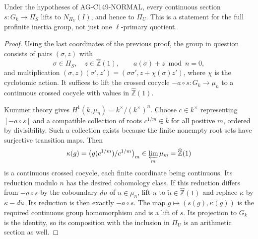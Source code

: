 \begin{proposition}
Under the hypotheses of AG-C149-NORMAL, every continuous section
$s:G_k\to\Pi_S$ lifts to $N_{\Pi_U}(I)$, and hence to $\Pi_U$.
This is a statement for the full profinite inertia group,
not just one $\ell$-primary quotient.
\end{proposition}
\begin{proof}
Using the last coordinates of the previous proof, the group in
question consists of pairs $(\sigma,z)$ with
\[
 \sigma\in\Pi_S,\quad z\in\widehat{\mathbb Z}(1),\qquad
 a(\sigma)+z\bmod n=0,
\]
and multiplication
$(\sigma,z)(\sigma',z')=(\sigma\sigma',z+\chi(\sigma)z')$,
where $\chi$ is the cyclotomic action. It suffices to lift the
crossed cocycle $-a\circ s:G_k\to\mu_n$ to a continuous
crossed cocycle with values in $\widehat{\mathbb Z}(1)$.

Kummer theory gives $H^1(k,\mu_n)=k^\times/(k^\times)^n$.
Choose $c\in k^\times$ representing $[-a\circ s]$ and a
compatible collection of roots $c^{1/m}\in\bar k$ for all
positive $m$, ordered by divisibility. Such a collection exists
because the finite nonempty root sets have surjective transition
maps. Then
\[
 \kappa(g)=\bigl(g(c^{1/m})/c^{1/m}\bigr)_m
       \in\varprojlim_m\mu_m=\widehat{\mathbb Z}(1)
\]
is a continuous crossed cocycle, each finite coordinate being
continuous. Its reduction modulo $n$ has the desired cohomology
class. If this reduction differs from $-a\circ s$ by the
coboundary $du$ of $u\in\mu_n$, lift $u$ to
$\tilde u\in\widehat{\mathbb Z}(1)$ and replace $\kappa$ by
$\kappa-d\tilde u$. Its reduction is then exactly $-a\circ s$.
The map $g\mapsto(s(g),\kappa(g))$ is the required continuous
group homomorphism and is a lift of $s$. Its projection to $G_k$
is the identity, so its composition with the inclusion in
$\Pi_U$ is an arithmetic section as well.
\end{proof}

